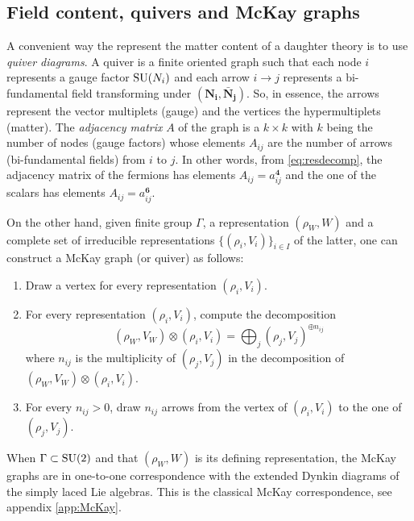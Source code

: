         \subsection{Field content, quivers and McKay graphs}

            A convenient way the represent the matter content of a daughter theory is to use \emph{quiver diagrams}. A quiver is a finite oriented graph such that each node $i$ represents a gauge factor $\text{SU}(N_i)$ and each arrow $i\to j$ represents a bi-fundamental field transforming under $(\boldsymbol{\textbf{N}_i},\boldsymbol{\bar{\textbf{N}}_j})$. So, in essence, the arrows represent the vector multiplets (gauge) and the vertices the hypermultiplets (matter). The \emph{adjacency matrix} $A$ of the graph is a $k\times k$ with $k$ being the number of nodes (gauge factors) whose elements $A_{ij}$ are the number of arrows (bi-fundamental fields) from $i$ to $j$. In other words, from \eqref{eq:resdecomp}, the adjacency matrix of the fermions has elements $A_{ij}=a^{\boldsymbol{4}}_{ij}$ and the one of the scalars has elements $A_{ij}=a^{\boldsymbol{6}}_{ij}$.

            On the other hand, given finite group $\Gamma$, a representation $(\rho_W,W)$ and a complete set of irreducible representations $\{(\rho_i,V_i)\}_{i\in I}$ of the latter, one can construct a McKay graph (or quiver) as follows:
            \begin{enumerate}
                \item Draw a vertex for every representation $(\rho_i,V_i)$.
                \item For every representation $(\rho_i,V_i)$, compute the decomposition
                \begin{equation*}
                    (\rho_W,V_W)\otimes(\rho_i,V_i)=\bigoplus_j (\rho_j,V_j)^{\oplus n_{ij}}
                \end{equation*}
                where $n_{ij}$ is the multiplicity of $(\rho_j,V_j)$ in the decomposition of $(\rho_W,V_W)\otimes(\rho_i,V_i)$.
                \item For every $n_{ij}>0$, draw $n_{ij}$ arrows from the vertex of $(\rho_i,V_i)$ to the one of $(\rho_j,V_j)$.
            \end{enumerate}
            When $\Gamma\subset\text{SU}(2)$ and that $(\rho_W,W)$ is its defining representation, the McKay graphs are in one-to-one correspondence with the extended Dynkin diagrams of the simply laced Lie algebras. This is the classical McKay correspondence, see appendix \ref{app:McKay}.
            
